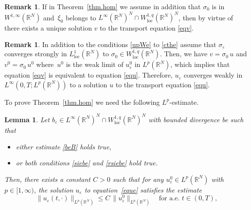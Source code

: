\documentclass[JEP,XML,SOM,Unicode]{cedram}
\newcommand{\loc}{\mathrm{loc}}
\def \RR {\mathbb R}
\theoremstyle{plain}
\newtheorem{Lem}[Thm]{Lemma}
\theoremstyle{definition}
\newtheorem{Rem}[Thm]{Remark}
\begin{document}
\begin{Rem}\label{rem.uni}
If in Theorem~\ref{thm.hom} we assume in addition that $\sigma_0$ is in $W^{1,\infty}(\RR^N)$ and~$\xi_0$ belongs to $L^\infty(\RR^N)^N\cap W^{1,q}_\loc(\RR^N)^N$, then by virtue of \cite[Cor.\,II.1]{DiLi} there exists a unique solution $v$ to the transport equation \eqref{eqv}.
\end{Rem}
\begin{Rem}\label{rem.vsiu}
In addition to the conditions \eqref{upWe} to \eqref{cthe} assume that $\sigma_\varepsilon$ converges strongly in $L^1_\loc(\RR^N)$ to $\sigma_0\in W^{1,q}_\loc(\RR^N)$. Then, we have $v=\sigma_0\,u$ and $v^0=\sigma_0\,u^0$ where~$u^0$ is the weak limit of $u_\varepsilon^0$ in $L^p(\RR^N)$, which implies that equation \eqref{eqv} is equivalent to equation \eqref{equ}. Therefore, $u_\varepsilon$ converges weakly in $L^\infty(0,T;L^p(\RR^N))$ to a solution $u$ to the transport equation \eqref{equ}.
\end{Rem}
To prove Theorem~\ref{thm.hom} we need the following $L^p$-estimate.
\begin{Lem}\label{lem.Lpeue}
Let $b_\varepsilon\in L^\infty(\RR^N)^N\cap W^{1,q}_\loc(\RR^N)^N$ with bounded divergence be such that
\begin{itemize}
\item either estimate \eqref{beB} holds true,
\item or both conditions \eqref{siebe} and \eqref{rsiebe} hold true.
\end{itemize}
Then, there exists a constant $C>0$ such that for any $u_\varepsilon^0\in L^p(\RR^N)$ with $p\in[1,\infty)$, the solution $u_\varepsilon$ to equation~\eqref{eque} satisfies the estimate
\begin{equation}\label{Lpeue}
\|u_\varepsilon(t,\cdot)\|_{L^p(\RR^N)}\leq C\,\|u_\varepsilon^0\|_{L^p(\RR^N)}\quad\mbox{for a.e. }t\in(0,T),
\end{equation}
\end{Lem}
\end{document}
